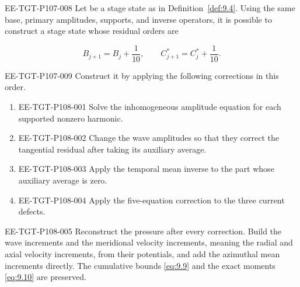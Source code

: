 \begin{proposition}\label{prop:9.6}
\begin{EESegment}{EE-TGT-P107-008}
Let  be a stage
 state as in Definition~\ref{def:9.4}. Using the same base, primary
amplitudes, supports, and inverse operators, it is possible to construct a stage
 state whose residual orders are
\end{EESegment}
\[
B_{j+1}=B_j+\frac1{10},
\qquad
C_{j+1}^*=C_j^*+\frac1{10}.
\]
\begin{EESegment}{EE-TGT-P107-009}
Construct it by applying the following corrections in this order.
\end{EESegment}
\begin{enumerate}[label=(\roman*)]
%
\item \begin{EESegment}{EE-TGT-P108-001}
Solve the inhomogeneous amplitude equation for each supported nonzero harmonic.
\end{EESegment}
\item \begin{EESegment}{EE-TGT-P108-002}
Change the wave amplitudes so that they correct the tangential residual after taking its auxiliary
average.
\end{EESegment}
\item \begin{EESegment}{EE-TGT-P108-003}
Apply the temporal mean inverse to the part whose auxiliary average is zero.
\end{EESegment}
\item \begin{EESegment}{EE-TGT-P108-004}
Apply the five-equation correction to the three current defects.
\end{EESegment}
\end{enumerate}
\begin{EESegment}{EE-TGT-P108-005}
Reconstruct the pressure after every correction. Build the wave increments and the meridional
velocity increments, meaning the radial and axial velocity increments, from their potentials, and
add the azimuthal mean increments directly. The cumulative bounds
\eqref{eq:9.9} and the exact moments \eqref{eq:9.10} are preserved.
\end{EESegment}
\end{proposition}


